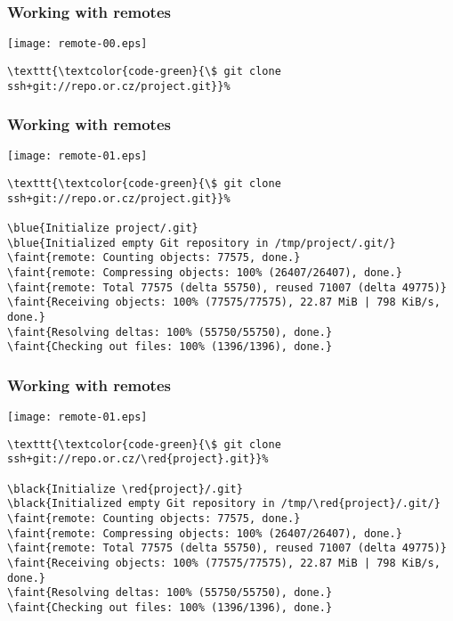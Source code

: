 \documentclass[english]{beamer}
\newcommand{\CMD}[1]{%
\texttt{\textcolor{code-green}{#1}}%
}
\newcommand{\black}[1]{%
\textcolor{code-black}{#1}%
}
\newcommand{\faint}[1]{%
\textcolor{code-gray}{#1}%
}
\newcommand{\blue}[1]{%
\textcolor{code-blue}{#1}%
}
\newcommand{\red}[1]{%
\textcolor{code-red}{#1}%
}
\begin{document}
\begin{frame}[fragile]
\frametitle{Working with remotes}

\texttt{[image: remote-00.eps]}

\begin{Verbatim}[commandchars=\\\{\}]
\CMD{\$ git clone ssh+git://repo.or.cz/project.git}
\end{Verbatim}
\vspace{\textheight}
\end{frame}

\begin{frame}[fragile]
\frametitle{Working with remotes}

\texttt{[image: remote-01.eps]}

{\tiny
\begin{Verbatim}[commandchars=\\\{\}]
\CMD{\$ git clone ssh+git://repo.or.cz/project.git}
\blue{Initialize project/.git}
\blue{Initialized empty Git repository in /tmp/project/.git/}
\faint{remote: Counting objects: 77575, done.}
\faint{remote: Compressing objects: 100% (26407/26407), done.}
\faint{remote: Total 77575 (delta 55750), reused 71007 (delta 49775)}
\faint{Receiving objects: 100% (77575/77575), 22.87 MiB | 798 KiB/s, done.}
\faint{Resolving deltas: 100% (55750/55750), done.}
\faint{Checking out files: 100% (1396/1396), done.}
\end{Verbatim}
}
\vspace{\textheight}
\end{frame}

\begin{frame}[fragile]
\frametitle{Working with remotes}

\texttt{[image: remote-01.eps]}

{\tiny
\begin{Verbatim}[commandchars=\\\{\}]
\CMD{\$ git clone ssh+git://repo.or.cz/\red{project}.git}
\black{Initialize \red{project}/.git}
\black{Initialized empty Git repository in /tmp/\red{project}/.git/}
\faint{remote: Counting objects: 77575, done.}
\faint{remote: Compressing objects: 100% (26407/26407), done.}
\faint{remote: Total 77575 (delta 55750), reused 71007 (delta 49775)}
\faint{Receiving objects: 100% (77575/77575), 22.87 MiB | 798 KiB/s, done.}
\faint{Resolving deltas: 100% (55750/55750), done.}
\faint{Checking out files: 100% (1396/1396), done.}
\end{Verbatim}
}
\vspace{\textheight}
\end{frame}
\end{document}
